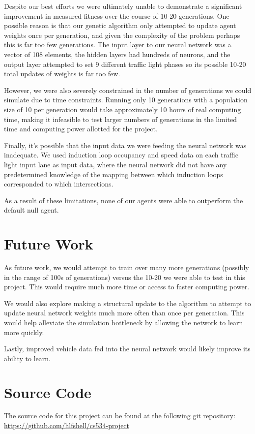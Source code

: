 \documentclass[twocolumn]{article}
\begin{document}
Despite our best efforts we were ultimately unable to demonstrate a significant improvement in measured fitness over the course of 10-20 generations. One possible reason is that our genetic algorithm only attempted to update agent weights once per generation, and given the complexity of the problem perhaps this is far too few generations. The input layer to our neural network was a vector of 108 elements, the hidden layers had hundreds of neurons, and the output layer attempted to set 9 different traffic light phases so its possible 10-20 total updates of weights is far too few.

However, we were also severely constrained in the number of generations we could simulate due to time constraints. Running only 10 generations with a population size of 10 per generation would take approximately 10 hours of real computing time, making it infeasible to test larger numbers of generations in the limited time and computing power allotted for the project.

Finally, it’s possible that the input data we were feeding the neural network was inadequate. We used induction loop occupancy and speed data on each traffic light input lane as input data, where the neural network did not have any predetermined knowledge of the mapping between which induction loops corresponded to which intersections.

As a result of these limitations, none of our agents were able to outperform the default null agent.



\section{Future Work}
As future work, we would attempt to train over many more generations (possibly in the range of 100s of generations) versus the 10-20 we were able to test in this project. This would require much more time or access to faster computing power.

We would also explore making a structural update to the algorithm to attempt to update neural network weights much more often than once per generation. This would help alleviate the simulation bottleneck by allowing the network to learn more quickly.

Lastly, improved vehicle data fed into the neural network would likely improve its ability to learn.


\section{Source Code}
The source code for this project can be found at the following git repository: \url{https://github.com/hlfshell/cs534-project} 




\end{document}

